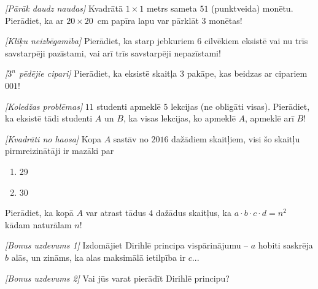 \begin{problem}
\textit{[Pārāk daudz naudas]}
Kvadrātā $1\times 1$ metrs sameta $51$ (punktveida) monētu. Pierādiet, ka ar \mbox{$20\times 20$ cm} papīra lapu var pārklāt $3$ monētas!

\end{problem}

\begin{problem}
\textit{[Kliķu neizbēgamība]}
Pierādiet, ka starp jebkuriem  $6$ cilvēkiem eksistē vai nu trīs savstarpēji pazīstami, vai arī trīs savstarpēji nepazīstami!
\end{problem}

\begin{problem}
\textit{[$3^n$ pēdējie cipari]}
Pierādiet, ka eksistē skaitļa 3 pakāpe, kas beidzas ar cipariem $001$!
\end{problem}

\begin{problem}
\textit{[Koledžas problēmas]}
$11$ studenti apmeklē $5$ lekcijas (ne obligāti visas). Pierādiet, ka eksistē tādi studenti $A$ un $B$, ka visas lekcijas, ko apmeklē $A$, apmeklē arī $B$!
\end{problem}

\begin{problem}
\textit{[Kvadrāti no haosa]}
Kopa $A$ sastāv no $2016$ dažādiem skaitļiem, visi šo skaitļu pirmreizinātāji ir mazāki par 
\renewcommand{\labelenumi}{\alph{enumi})}
\begin{enumerate}
\item
29
\item
30
\end{enumerate}
Pierādiet, ka kopā $A$ var atrast tādus $4$ dažādus skaitļus, ka $a\cdot b \cdot c \cdot d = n^2$ kādam naturālam $n$!
\end{problem}

\begin{problem}
\textit{[Bonus uzdevums 1]}
Izdomājiet Dirihlē principa vispārinājumu – $a$ hobiti saskrēja $b$ alās, un zināms, ka alas maksimālā ietilpība ir $c$...
\end{problem}

\begin{problem}
\textit{[Bonus uzdevums 2]}
Vai jūs varat pierādīt Dirihlē principu?
\end{problem}


